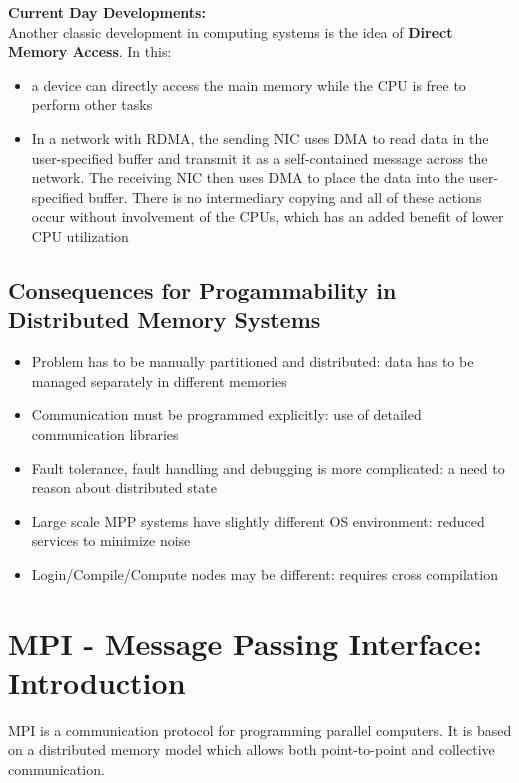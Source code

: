 \documentclass[12pt, a4paper]{report}
\begin{document}
{\bfseries{Current Day Developments:}}\\
Another classic development in computing systems is the idea of {\bfseries{Direct Memory Access}}. In this:
\begin{itemize}
    \item a device can directly access the main memory while the CPU is free to perform other tasks
    \item In a network with RDMA, the sending NIC uses DMA to read data in the user-specified buffer and transmit it as a self-contained message across the 
          network. The receiving NIC then uses DMA to place the data into the user-specified buffer. There is no intermediary copying and all of these actions 
          occur without involvement of the CPUs, which has an added benefit of lower CPU utilization
\end{itemize}

\subsection{Consequences for Progammability in Distributed Memory Systems}
\begin{itemize}
    \item Problem has to be manually partitioned and distributed: data has to be managed separately in different memories
    \item Communication must be programmed explicitly: use of detailed communication libraries
    \item Fault tolerance, fault handling and debugging is more complicated: a need to reason about distributed state
    \item Large scale MPP systems have slightly different OS environment: reduced services to minimize noise
    \item Login/Compile/Compute nodes may be different: requires cross compilation
\end{itemize}



\section{MPI - Message Passing Interface: Introduction}
MPI is a communication protocol for programming parallel computers. It is based on a distributed memory model which allows
both point-to-point and collective communication.\\
\end{document}
